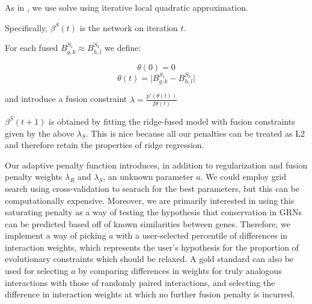 \documentclass[11pt]{article}
\begin{document}
As in \cite{fan2001variable}, we use solve using iterative local quadratic approximation. 

Specifically, $\beta^S(t)$ is the network on iteration $t$. 

For each fused $B^{S_1}_{g,k} \approx B^{S_2}_{h,l}$ we define:

\begin{equation} 
\theta(0)=0
\end{equation}
\begin{equation}
\theta(t) = \vert B^{S_1}_{g,k} - B^{S_2}_{h,l} \vert
\end{equation}

and introduce a fusion constraint $\lambda = \frac{p'(\theta(t))}{2\theta(t)} $

$\beta^S(t+1)$ is obtained by fitting the ridge-fused model with fusion constraints given by the above $\lambda_S$. This is nice because all our penalties can be treated as L2 and therefore retain the properties of ridge regression. 

Our adaptive penalty function introduces, in addition to regularization and fusion penalty weights $\lambda_R$ and $\lambda_S$, an unknown parameter $a$. We could employ grid search using cross-validation to searach for the best parameters, but this can be computationally expensive. Moreover, we are primarily interested in using this saturating penalty as a way of testing the hypothesis that conservation in GRNs can be predicted based off of known similarities between genes. Therefore, we implement a way of picking $a$ with a user-selected percentile of differences in interaction weights, which represents the user's hypothesis for the proportion of evolutionary constraints which should be relaxed. A gold standard can also be used for selecting $a$ by comparing differences in weights for truly analogous interactions with those of randomly paired interactions, and selecting the difference in interaction weights at which no further fusion penalty is incurred. 

\end{document}
